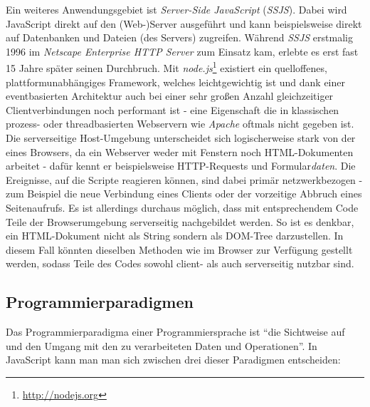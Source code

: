 Ein weiteres Anwendungsgebiet ist \emph{Server-Side JavaScript} (\emph{SSJS}). Dabei wird JavaScript
direkt auf den (Web-)Server ausgeführt und kann beispielsweise direkt auf Datenbanken und Dateien
(des Servers) zugreifen. Während \emph{SSJS} erstmalig 1996 im \emph{Netscape Enterprise HTTP Server}
zum Einsatz kam, erlebte es erst fast 15 Jahre später seinen Durchbruch. Mit
\emph{node.js}\footnote{\href{http://nodejs.org}{http://nodejs.org}} existiert ein quelloffenes,
plattformunabhängiges Framework, welches leichtgewichtig ist und dank einer eventbasierten Architektur
auch bei einer sehr großen Anzahl gleichzeitiger Clientverbindungen noch performant ist - eine
Eigenschaft die in klassischen prozess- oder threadbasierten Webservern wie \emph{Apache} oftmals
nicht gegeben ist. Die serverseitige Host-Umgebung unterscheidet sich logischerweise stark von der
eines Browsers, da ein Webserver weder mit Fenstern noch HTML-Dokumenten arbeitet - dafür kennt er
beispielsweise HTTP-Requests und Formular\emph{daten}. Die Ereignisse, auf die Scripte reagieren
können, sind dabei primär netzwerkbezogen - zum Beispiel die neue Verbindung eines Clients oder
der vorzeitige Abbruch eines Seitenaufrufs. Es ist allerdings durchaus möglich, dass mit
entsprechendem Code Teile der Browserumgebung serverseitig nachgebildet werden. So ist es denkbar,
ein HTML-Dokument nicht als String sondern als DOM-Tree darzustellen. In diesem Fall könnten
dieselben Methoden wie im Browser zur Verfügung gestellt werden, sodass Teile des Codes sowohl
client- als auch serverseitig nutzbar sind.


\subsection{Programmierparadigmen}

Das Programmierparadigma einer Programmiersprache ist \enquote{die Sichtweise auf und den Umgang mit
den zu verarbeiteten Daten und Operationen}. \citep[Kap. 1.3.1]{progsprachen} In JavaScript kann man
man sich zwischen drei dieser Paradigmen entscheiden:

